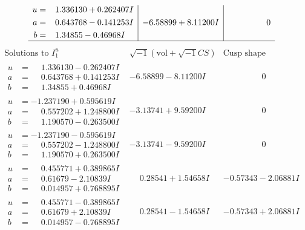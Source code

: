 \documentclass[1p]{elsarticle_modified}
\theoremstyle{definition}
\newcommand{\I}{\sqrt{-1}}
\begin{document}
$$\begin{array}{c|c|c}
\begin{aligned}
u &= \phantom{-}1.336130 + 0.262407 I \\
a &= \phantom{-}0.643768 - 0.141253 I \\
b &= \phantom{-}1.34855 - 0.46968 I\end{aligned}
 & -6.58899 + 8.11200 I & \phantom{-0.000000 } 0\\
 \hline 
 \end{array}$$\newpage$$\begin{array}{c|c|c}  
\text{Solutions to }I^u_{1}& \I (\text{vol} + \sqrt{-1}CS) & \text{Cusp shape}\\
 \hline 
\begin{aligned}
u &= \phantom{-}1.336130 - 0.262407 I \\
a &= \phantom{-}0.643768 + 0.141253 I \\
b &= \phantom{-}1.34855 + 0.46968 I\end{aligned}
 & -6.58899 - 8.11200 I & \phantom{-0.000000 } 0 \\ \hline\begin{aligned}
u &= -1.237190 + 0.595619 I \\
a &= \phantom{-}0.557202 + 1.248800 I \\
b &= \phantom{-}1.190570 - 0.263500 I\end{aligned}
 & -3.13741 + 9.59200 I & \phantom{-0.000000 } 0 \\ \hline\begin{aligned}
u &= -1.237190 - 0.595619 I \\
a &= \phantom{-}0.557202 - 1.248800 I \\
b &= \phantom{-}1.190570 + 0.263500 I\end{aligned}
 & -3.13741 - 9.59200 I & \phantom{-0.000000 } 0 \\ \hline\begin{aligned}
u &= \phantom{-}0.455771 + 0.389865 I \\
a &= \phantom{-}0.61679 - 2.10839 I \\
b &= \phantom{-}0.014957 + 0.768895 I\end{aligned}
 & \phantom{-}0.28541 + 1.54658 I & -0.57343 - 2.06881 I \\ \hline\begin{aligned}
u &= \phantom{-}0.455771 - 0.389865 I \\
a &= \phantom{-}0.61679 + 2.10839 I \\
b &= \phantom{-}0.014957 - 0.768895 I\end{aligned}
 & \phantom{-}0.28541 - 1.54658 I & -0.57343 + 2.06881 I \\ \hline\begin{aligned}

\end{aligned}
\end{array}$$
\end{document}
